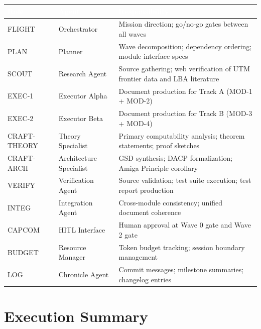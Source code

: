 \documentclass[11pt,letterpaper]{article}
\newcommand{\tableheader}[1]{\textbf{\sffamily\textcolor{white}{#1}}}
\begin{document}
\begin{center}
\begin{tabularx}{\textwidth}{L{2.5cm}L{3cm}X}
\toprule
{}
\tableheader{Role} & \tableheader{Agent} & \tableheader{Responsibility} \\
\midrule
FLIGHT & Orchestrator & Mission direction; go/no-go gates between all waves \\
PLAN & Planner & Wave decomposition; dependency ordering; module interface specs \\
SCOUT & Research Agent & Source gathering; web verification of UTM frontier data and LBA literature \\
EXEC-1 & Executor Alpha & Document production for Track A (MOD-1 + MOD-2) \\
EXEC-2 & Executor Beta & Document production for Track B (MOD-3 + MOD-4) \\
CRAFT-THEORY & Theory Specialist & Primary computability analysis; theorem statements; proof sketches \\
CRAFT-ARCH & Architecture Specialist & GSD synthesis; DACP formalization; Amiga Principle corollary \\
VERIFY & Verification Agent & Source validation; test suite execution; test report production \\
INTEG & Integration Agent & Cross-module consistency; unified document coherence \\
CAPCOM & HITL Interface & Human approval at Wave 0 gate and Wave 2 gate \\
BUDGET & Resource Manager & Token budget tracking; session boundary management \\
LOG & Chronicle Agent & Commit messages; milestone summaries; changelog entries \\
\bottomrule
\end{tabularx}
\end{center}

\section{Execution Summary}
\end{document}
